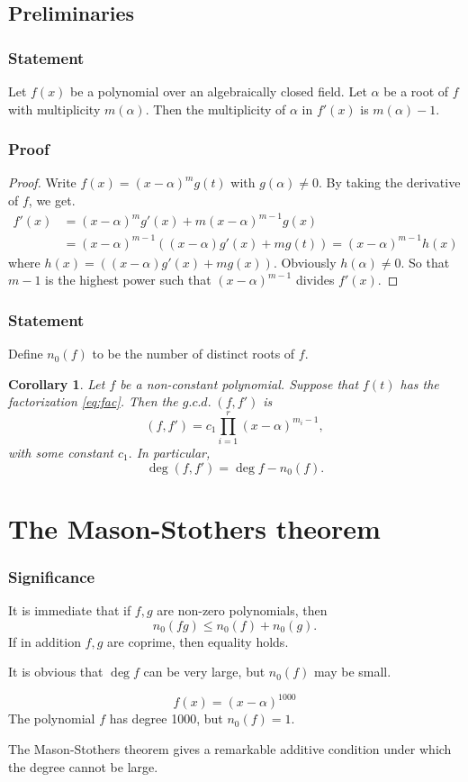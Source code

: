 \documentclass[envcountsect]{beamer}
\newtheorem{prop}{Corollary}
\begin{document}
\begin{frame}
\section{Preliminaries}
\frametitle{Statement}
\begin{lemma}
Let $f(x)$ be a polynomial over an algebraically closed field. Let $\alpha$ be a
root of $f$ with multiplicity $m(\alpha)$. Then the multiplicity of $\alpha$ in
$f'(x)$ is $m(\alpha) - 1.$ 
\end{lemma}
\end{frame}

\begin{frame}
\frametitle{Proof}
\begin{proof}
Write $f(x) = (x-\alpha)^{m}g(t)$ with $g(\alpha) \neq 0.$ By taking the
derivative of $f$, we get.
\begin{align*}
  f'(x) &= (x-\alpha)^mg'(x) + m(x-\alpha)^{m-1}g(x) \\
        &= (x-\alpha)^{m-1}((x-\alpha)g'(x)+mg(t)) = (x-\alpha)^{m-1}h(x)
\end{align*}  
where $h(x) = ((x-\alpha)g'(x)+mg(x))$. Obviously $h(\alpha) \neq 0.$ So that
$m-1$ is the highest power such that $(x-\alpha)^{m-1}$ divides $f'(x).$

\end{proof}
\end{frame}

\begin{frame}
  \frametitle{Statement}
  Define $n_0(f)$ to be the number of distinct roots of $f$.
  \begin{prop}
   Let $f$ be a non-constant polynomial. Suppose that $f(t)$ has the
   factorization \eqref{eq:fac}. Then the $g.c.d. \; (f,f')$ is
   \[
     (f,f') = c_1\prod_{i=1}^r(x-\alpha)^{m_i-1},
   \]
   with some constant $c_1.$ In particular,
   \[
     \operatorname{deg}(f,f') = \operatorname{deg}f - n_0(f).
   \]
  \end{prop}
\end{frame}
\section{The Mason-Stothers theorem}
\begin{frame}
\frametitle{Significance}

It is immediate that if $f,g$ are non-zero polynomials, then
\[
n_0(fg) \leq n_0(f) + n_0(g).
\]
If in addition $f,g$ are coprime, then equality holds.

It is obvious that $\operatorname{deg} f$ can be very large, but $n_0(f)$ may be
small.

\begin{example}
  \[
f(x) = (x-\alpha)^{1000}
 \]
 The polynomial $f$ has degree 1000, but $n_0(f) = 1.$
\end{example}
The Mason-Stothers theorem gives a remarkable additive condition under which the degree cannot be large.
\end{frame}
\end{document}
